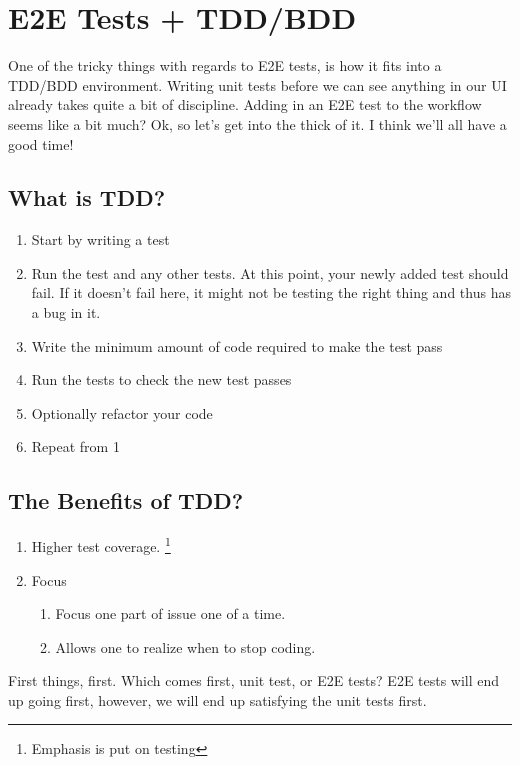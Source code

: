 \maketitle{}
\section{ E2E Tests + TDD/BDD }

One of the tricky things with regards to E2E tests, is how it fits into a
TDD/BDD environment. Writing unit tests before we can see anything in our UI
already takes quite a bit of discipline. Adding in an E2E test to the workflow
seems like a bit much? Ok, so let's get into the thick of it. I think we'll all
have a good time!

\subsection{ What is TDD? }

\begin{enumerate}
  \item Start by writing a test
  \item Run the test and any other tests. At this point, your newly added test
   should fail. If it doesn’t fail here, it might not be testing the right
   thing and thus has a bug in it.
  \item Write the minimum amount of code required to make the test pass
  \item Run the tests to check the new test passes
  \item Optionally refactor your code
  \item Repeat from 1
\end{enumerate}

\subsection{ The Benefits of TDD? }
\begin{enumerate}
  \item Higher test coverage. \footnote{Emphasis is put on testing}
  \item Focus
    \begin{enumerate}
      \item Focus one part of issue one of a time.
      \item Allows one to realize when to stop coding.
    \end{enumerate}
\end{enumerate}


First things, first. Which comes first, unit test, or E2E tests? E2E tests will
end up going first, however, we will end up satisfying the unit tests first.
